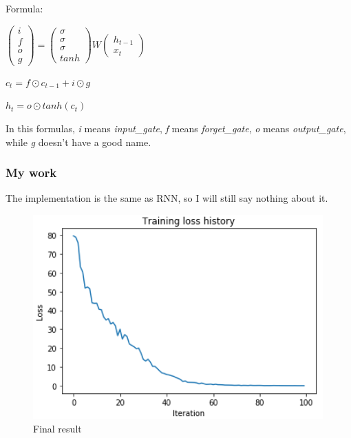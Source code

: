 \documentclass{article}
\begin{document}
Formula:

\begin{center}
	$\left( \begin{array}{ccc} i\\f\\o\\g\end{array} \right)
	=\left( \begin{array}{ccc} \sigma\\\sigma\\\sigma\\tanh\end{array} \right)
	W\left( \begin{array}{ccc} h_{t-1}\\x_t \end{array} \right)$

	${\displaystyle c_t=f\odot c_{t-1}+i\odot g}$
	
	${\displaystyle h_t=o \odot tanh(c_t)}$
\end{center}

In this formulas, \textsl{i} means \textsl{input\_gate}, \textsl{f} means \textsl{forget\_gate}, \textsl{o} means \textsl{output\_gate}, while \textsl{g} doesn't have a good name.

\subsubsection{My work}
The implementation is the same as RNN, so I will still say nothing about it.


\begin{figure}[htbp]
	\centering  %
	\includegraphics[width=.7\textwidth]{6.png} 
	\caption{Final result}  %
	\label{fig:f6}   %
\end{figure}
\end{document}
